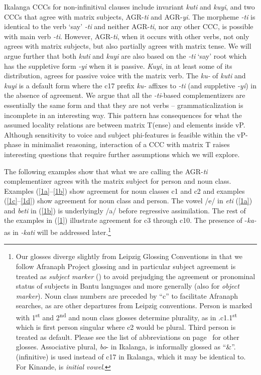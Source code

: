 \documentclass[output=paper,
modfonts
]{langscibook}
\begin{document}
Ikalanga CCCs for non-infinitival clauses include invariant \textit{kuti} and \textit{kuyi}, and two CCCs that agree with matrix subjects, AGR-\textit{ti} and AGR-\textit{yi}. The morpheme \textit{-ti} is identical to the verb ‘say’ \textit{-ti} and neither AGR-\textit{ti}, nor any other CCC, is possible with main verb \textit{-ti}. However, AGR-\textit{ti}, when it occurs with other verbs, not only agrees with matrix subjects, but also partially agrees with matrix tense. We will argue further that both \textit{kuti} and \textit{kuyi} are also based on the \textit{-ti} ‘say’ root which has the suppletive form \textit{-yi} when it is passive. \textit{Kuyi}, in at least some of its distribution, agrees for passive voice with the matrix verb. The \textit{ku-} of \textit{kuti} and \textit{kuyi} is a default form where the c17 prefix \textit{ku-} affixes to \textit{-ti} (and suppletive \textit{-yi}) in the absence of agreement.  We argue that all the \textit{-ti}-based complementizers are essentially the same form and that they are not verbs – grammaticalization is incomplete in an interesting way. This pattern has consequences for what the assumed locality relations are between matrix T(ense)  and elements inside vP. Although sensitivity to voice and subject phi-features is feasible within the vP-phase in minimalist reasoning, interaction of a CCC with matrix T raises interesting questions that require further assumptions which we will explore.

The following examples show that what we are calling the AGR-\textit{ti} complementizer agrees with the matrix subject for person and noun class. Examples (\ref{1a}--\ref{1b}) show agreement for noun classes c1 and c2 and examples (\ref{1c}--\ref{1d}) show agreement for noun class and person. The vowel /e/ in \textit{eti} (\ref{1a}) and \textit{beti} in (\ref{1b}) is underlyingly /a/ before regressive assimilation. The rest of the examples in (\ref{1}) illustrate agreement for c3 through c10. The presence of -\textit{ka-} as in \textit{-kati} will be addressed later.\footnote{Our glosses diverge slightly from Leipzig Glossing Conventions in that we follow Afranaph Project glossing \citep{AfranaphDatabaseOngoing} and in particular subject agreement is treated as \textit{subject marker} () to avoid prejudging the agreement or pronominal status of subjects in Bantu languages and more generally (also  for \textit{object marker}). Noun class numbers are preceded by ``c'' to facilitate Afranaph searches, as are other departures from Leipzig conventions. Person is marked with 1\textsuperscript{st} and 2\textsuperscript{nd} and noun class glosses determine plurality, as in .c1.1\textsuperscript{st} which is first person singular where c2 would be plural. Third person is treated as default. Please see the list of abbreviations on page~\pageref{pg:lesotho:abbreviations} for other glosses. Associative plural, \textit{bo}- in Ikalanga, is informally glossed as ``\&''.  (infinitive) is used instead of c17 in Ikalanga, which it may be identical to. For Kinande,  is \textit{initial vowel}.}  
\end{document}

